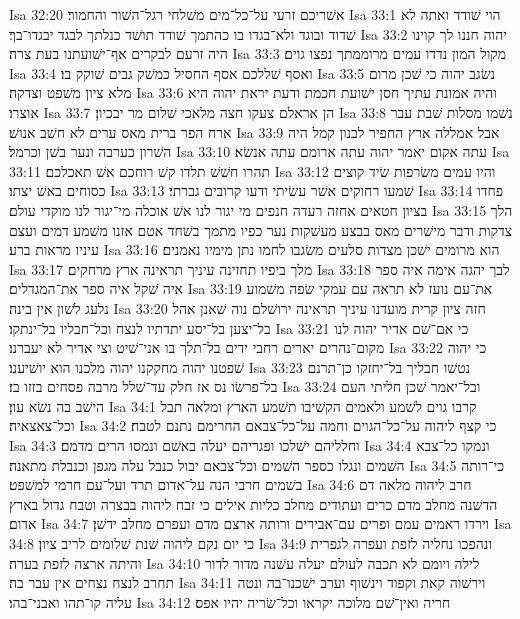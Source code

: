 Isa 32:20  אשׁריכם זרעי על־כל־מים משׁלחי רגל־השׁור והחמור׃
Isa 33:1  הוי שׁודד ואתה לא שׁדוד ובוגד ולא־בגדו בו כהתמך שׁודד תושׁד כנלתך לבגד יבגדו־בך׃
Isa 33:2  יהוה חננו לך קוינו היה זרעם לבקרים אף־ישׁועתנו בעת צרה׃
Isa 33:3  מקול המון נדדו עמים מרוממתך נפצו גוים׃
Isa 33:4  ואסף שׁללכם אסף החסיל כמשׁק גבים שׁוקק בו׃
Isa 33:5  נשׂגב יהוה כי שׁכן מרום מלא ציון משׁפט וצדקה׃
Isa 33:6  והיה אמונת עתיך חסן ישׁועת חכמת ודעת יראת יהוה היא אוצרו׃
Isa 33:7  הן אראלם צעקו חצה מלאכי שׁלום מר יבכיון׃
Isa 33:8  נשׁמו מסלות שׁבת עבר ארח הפר ברית מאס ערים לא חשׁב אנושׁ׃
Isa 33:9  אבל אמללה ארץ החפיר לבנון קמל היה השׁרון כערבה ונער בשׁן וכרמל׃
Isa 33:10  עתה אקום יאמר יהוה עתה ארומם עתה אנשׂא׃
Isa 33:11  תהרו חשׁשׁ תלדו קשׁ רוחכם אשׁ תאכלכם׃
Isa 33:12  והיו עמים משׂרפות שׂיד קוצים כסוחים באשׁ יצתו׃
Isa 33:13  שׁמעו רחוקים אשׁר עשׂיתי ודעו קרובים גברתי׃
Isa 33:14  פחדו בציון חטאים אחזה רעדה חנפים מי יגור לנו אשׁ אוכלה מי־יגור לנו מוקדי עולם׃
Isa 33:15  הלך צדקות ודבר מישׁרים מאס בבצע מעשׁקות נער כפיו מתמך בשׁחד אטם אזנו משׁמע דמים ועצם עיניו מראות ברע׃
Isa 33:16  הוא מרומים ישׁכן מצדות סלעים משׂגבו לחמו נתן מימיו נאמנים׃
Isa 33:17  מלך ביפיו תחזינה עיניך תראינה ארץ מרחקים׃
Isa 33:18  לבך יהגה אימה איה ספר איה שׁקל איה ספר את־המגדלים׃
Isa 33:19  את־עם נועז לא תראה עם עמקי שׂפה משׁמוע נלעג לשׁון אין בינה׃
Isa 33:20  חזה ציון קרית מועדנו עיניך תראינה ירושׁלם נוה שׁאנן אהל בל־יצען בל־יסע יתדתיו לנצח וכל־חבליו בל־ינתקו׃
Isa 33:21  כי אם־שׁם אדיר יהוה לנו מקום־נהרים יארים רחבי ידים בל־תלך בו אני־שׁיט וצי אדיר לא יעברנו׃
Isa 33:22  כי יהוה שׁפטנו יהוה מחקקנו יהוה מלכנו הוא יושׁיענו׃
Isa 33:23  נטשׁו חבליך בל־יחזקו כן־תרנם בל־פרשׂו נס אז חלק עד־שׁלל מרבה פסחים בזזו בז׃
Isa 33:24  ובל־יאמר שׁכן חליתי העם הישׁב בה נשׂא עון׃
Isa 34:1  קרבו גוים לשׁמע ולאמים הקשׁיבו תשׁמע הארץ ומלאה תבל וכל־צאצאיה׃
Isa 34:2  כי קצף ליהוה על־כל־הגוים וחמה על־כל־צבאם החרימם נתנם לטבח׃
Isa 34:3  וחלליהם ישׁלכו ופגריהם יעלה באשׁם ונמסו הרים מדמם׃
Isa 34:4  ונמקו כל־צבא השׁמים ונגלו כספר השׁמים וכל־צבאם יבול כנבל עלה מגפן וכנבלת מתאנה׃
Isa 34:5  כי־רותה בשׁמים חרבי הנה על־אדום תרד ועל־עם חרמי למשׁפט׃
Isa 34:6  חרב ליהוה מלאה דם הדשׁנה מחלב מדם כרים ועתודים מחלב כליות אילים כי זבח ליהוה בבצרה וטבח גדול בארץ אדום׃
Isa 34:7  וירדו ראמים עמם ופרים עם־אבירים ורותה ארצם מדם ועפרם מחלב ידשׁן׃
Isa 34:8  כי יום נקם ליהוה שׁנת שׁלומים לריב ציון׃
Isa 34:9  ונהפכו נחליה לזפת ועפרה לגפרית והיתה ארצה לזפת בערה׃
Isa 34:10  לילה ויומם לא תכבה לעולם יעלה עשׁנה מדור לדור תחרב לנצח נצחים אין עבר בה׃
Isa 34:11  וירשׁוה קאת וקפוד וינשׁוף וערב ישׁכנו־בה ונטה עליה קו־תהו ואבני־בהו׃
Isa 34:12  חריה ואין־שׁם מלוכה יקראו וכל־שׂריה יהיו אפס׃
